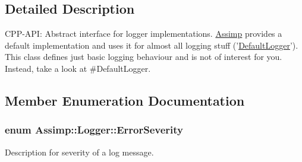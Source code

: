 \subsection{\-Detailed \-Description}
\-C\-P\-P-\/\-A\-P\-I\-: \-Abstract interface for logger implementations. \hyperlink{namespaceAssimp}{\-Assimp} provides a default implementation and uses it for almost all logging stuff ('\hyperlink{classAssimp_1_1DefaultLogger}{\-Default\-Logger}'). \-This class defines just basic logging behaviour and is not of interest for you. \-Instead, take a look at \#\-Default\-Logger. 

\subsection{\-Member \-Enumeration \-Documentation}
\hypertarget{classAssimp_1_1Logger_acd0b52a87d6fc11e957ed2c6e2ad75b6}{
\subsubsection[{\-Error\-Severity}]{\setlength{\rightskip}{0pt plus 5cm}enum {\bf \-Assimp\-::\-Logger\-::\-Error\-Severity}}}\label{classAssimp_1_1Logger_acd0b52a87d6fc11e957ed2c6e2ad75b6}


\-Description for severity of a log message. 

